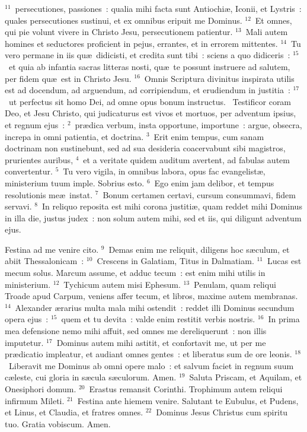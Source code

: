 ${}^{11}$~persecutiones, passiones~: qualia mihi facta sunt Antiochi\ae , Iconii, et Lystris~: quales persecutiones sustinui, et ex omnibus eripuit me Dominus.
${}^{12}$~Et omnes, qui pie volunt vivere in Christo Jesu, persecutionem patientur.
${}^{13}$~Mali autem homines et seductores proficient in pejus, errantes, et in errorem mittentes.
${}^{14}$~Tu vero permane in iis qu\ae\ didicisti, et credita sunt tibi~: sciens a quo didiceris~:
${}^{15}$~et quia ab infantia sacras litteras nosti, qu\ae\ te possunt instruere ad salutem, per fidem qu\ae\ est in Christo Jesu.
${}^{16}$~Omnis Scriptura divinitus inspirata utilis est ad docendum, ad arguendum, ad corripiendum, et erudiendum in justitia~:
${}^{17}$~ut perfectus sit homo Dei, ad omne opus bonum instructus.
~Testificor coram Deo, et Jesu Christo, qui judicaturus est vivos et mortuos, per adventum ipsius, et regnum ejus~:
${}^{2}$~pr\ae dica verbum, insta opportune, importune~: argue, obsecra, increpa in omni patientia, et doctrina.
${}^{3}$~Erit enim tempus, cum sanam doctrinam non sustinebunt, sed ad sua desideria coacervabunt sibi magistros, prurientes auribus,
${}^{4}$~et a veritate quidem auditum avertent, ad fabulas autem convertentur.
${}^{5}$~Tu vero vigila, in omnibus labora, opus fac evangelist\ae , ministerium tuum imple. Sobrius esto.
${}^{6}$~Ego enim jam delibor, et tempus resolutionis me\ae\ instat.
${}^{7}$~Bonum certamen certavi, cursum consummavi, fidem servavi.
${}^{8}$~In reliquo reposita est mihi corona justiti\ae , quam reddet mihi Dominus in illa die, justus judex~: non solum autem mihi, sed et iis, qui diligunt adventum ejus.

 Festina ad me venire cito.
${}^{9}$~Demas enim me reliquit, diligens hoc s\ae culum, et abiit Thessalonicam~:
${}^{10}$~Crescens in Galatiam, Titus in Dalmatiam.
${}^{11}$~Lucas est mecum solus. Marcum assume, et adduc tecum~: est enim mihi utilis in ministerium.
${}^{12}$~Tychicum autem misi Ephesum.
${}^{13}$~Penulam, quam reliqui Troade apud Carpum, veniens affer tecum, et libros, maxime autem membranas.
${}^{14}$~Alexander \ae rarius multa mala mihi ostendit~: reddet illi Dominus secundum opera ejus~:
${}^{15}$~quem et tu devita~: valde enim restitit verbis nostris.
${}^{16}$~In prima mea defensione nemo mihi affuit, sed omnes me dereliquerunt~: non illis imputetur.
${}^{17}$~Dominus autem mihi astitit, et confortavit me, ut per me pr\ae dicatio impleatur, et audiant omnes gentes~: et liberatus sum de ore leonis.
${}^{18}$~Liberavit me Dominus ab omni opere malo~: et salvum faciet in regnum suum c\ae leste, cui gloria in s\ae cula s\ae culorum. Amen.
${}^{19}$~Saluta Priscam, et Aquilam, et Onesiphori domum.
${}^{20}$~Erastus remansit Corinthi. Trophimum autem reliqui infirmum Mileti.
${}^{21}$~Festina ante hiemem venire. Salutant te Eubulus, et Pudens, et Linus, et Claudia, et fratres omnes.
${}^{22}$~Dominus Jesus Christus cum spiritu tuo. Gratia vobiscum. Amen.
